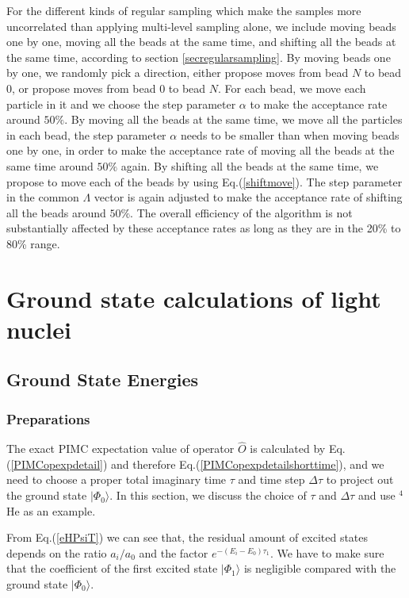 \documentclass[12pt,letterpaper,UTF8]{report}
\begin{document}
For the different kinds of regular sampling which make the samples more uncorrelated than applying multi-level sampling alone, we include moving beads one by one, moving all the beads at the same time, and shifting all the beads at the same time, according to section \ref{secregularsampling}.
By moving beads one by one, we randomly pick a direction, either propose moves from bead $N$ to bead $0$, or propose moves from bead $0$ to bead $N$.
For each bead, we move each particle in it and we choose the step parameter $\alpha$ to make the acceptance rate around $50\%$.
By moving all the beads at the same time, we move all the particles in each bead, the step parameter $\alpha$ needs to be smaller than when moving beads one by one, in order to make the acceptance rate of moving all the beads at the same time around $50\%$ again.
By shifting all the beads at the same time, we propose to move each of the beads by using Eq.(\ref{shiftmove}).
The step parameter in the common $\Lambda$ vector is again adjusted to make the acceptance rate of shifting all the beads around $50\%$.
The overall efficiency of the algorithm is not substantially affected by these acceptance rates as long as they are in the 20\% to 80\% range.




\chapter{Ground state calculations of light nuclei}
\label{RsDs}

\section{Ground State Energies}
\label{secGSE}

\subsection{Preparations}
\label{setup}


The exact PIMC expectation value of operator $\hat{O}$ is calculated by Eq.(\ref{PIMCopexpdetail}) and therefore Eq.(\ref{PIMCopexpdetailshorttime}), and we need to choose a proper total imaginary time $\tau$ and time step $\Delta \tau$ to project out the ground state $|\Phi_0\rangle$.
In this section, we discuss the choice of $\tau$ and $\Delta \tau$ and use $^4$He as an example.

From Eq.(\ref{eHPsiT}) we can see that, the residual amount of excited states depends on the ratio $a_i/a_0$ and the factor $e^{-(E_i-E_0)\tau_1}$.
We have to make sure that the coefficient of the first excited state $| \Phi_1 \rangle$ is negligible compared with the ground state $| \Phi_0 \rangle$.
\end{document}
